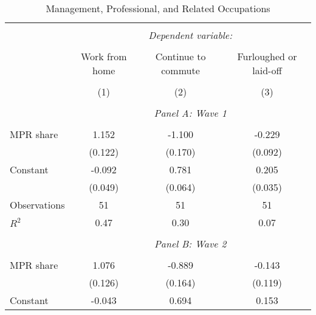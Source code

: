 \begin{table}[!htbp] \centering                    \caption{Management, Professional, and Related Occupations}                    \label{tab:priorindustry}                  \small                  \begin{tabular}{@{\extracolsep{5pt}}lccc}                  \\[-1.8ex]\hline                  \hline \\[-1.8ex]                   & \multicolumn{3}{c}{\textit{Dependent variable:}} \\                   \cline{2-4}                   \\[-1.8ex] & Work from home & Continue to commute & Furloughed or laid-off \\                   \hline \\[-1.8ex]               
                    &\multicolumn{1}{c}{(1)}         &\multicolumn{1}{c}{(2)}         &\multicolumn{1}{c}{(3)}         \\
\hline \\               & \multicolumn{3}{c}{\textit{Panel A: Wave 1}} \\               \addlinespace[1mm] \\
MPR share         &       1.152\sym{***}&      -1.100\sym{***}&      -0.229\sym{**} \\
&     (0.122)         &     (0.170)         &     (0.092)         \\
[1em]
Constant            &      -0.092\sym{*}  &       0.781\sym{***}&       0.205\sym{***}\\
                    &     (0.049)         &     (0.064)         &     (0.035)         \\
[1em]
Observations        &          51         &          51         &          51         \\
\(R^{2}\)           &        0.47         &        0.30         &        0.07         \\
\hline \\               & \multicolumn{3}{c}{\textit{Panel B: Wave 2}} \\               \addlinespace[1mm] \\
MPR share         &       1.076\sym{***}&      -0.889\sym{***}&      -0.143         \\
&     (0.126)         &     (0.164)         &     (0.119)         \\
[1em]
Constant            &      -0.043         &       0.694\sym{***}&       0.153\sym{***}\\

\end{tabular}
\end{table}
